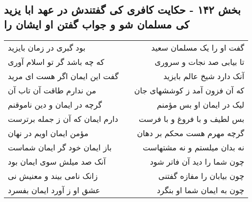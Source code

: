 \begin{center}
\section*{بخش ۱۴۲ - حکایت کافری کی گفتندش در عهد ابا یزید کی مسلمان شو و جواب گفتن او ایشان را}
\label{sec:sh142}
\begin{longtable}{l p{0.5cm} r}
بود گبری در زمان بایزید
&&
گفت او را یک مسلمان سعید
\\
که چه باشد گر تو اسلام آوری
&&
تا بیابی صد نجات و سروری
\\
گفت این ایمان اگر هست ای مرید
&&
آنک دارد شیخ عالم بایزید
\\
من ندارم طاقت آن تاب آن
&&
که آن فزون آمد ز کوششهای جان
\\
گرچه در ایمان و دین ناموقنم
&&
لیک در ایمان او بس مؤمنم
\\
دارم ایمان که آن ز جمله برترست
&&
بس لطیف و با فروغ و با فرست
\\
مؤمن ایمان اویم در نهان
&&
گرچه مهرم هست محکم بر دهان
\\
باز ایمان خود گر ایمان شماست
&&
نه بدان میلستم و نه مشتهاست
\\
آنک صد میلش سوی ایمان بود
&&
چون شما را دید آن فاتر شود
\\
زانک نامی بیند و معنیش نی
&&
چون بیابان را مفازه گفتنی
\\
عشق او ز آورد ایمان بفسرد
&&
چون به ایمان شما او بنگرد
\\
\end{longtable}
\end{center}
